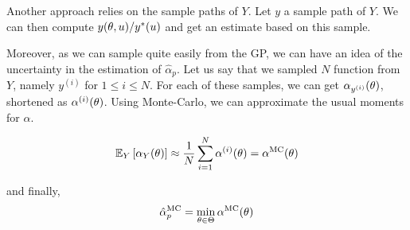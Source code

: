 \documentclass[../../Main_ManuscritThese.tex]{subfiles}
\begin{document}
Another approach relies on the sample paths of $Y$. Let $y$ a sample path of $Y$. We can then compute $y(\theta, u)/y^*(u)$ and get an estimate based on this sample.

Moreover, as we can sample quite easily from the GP, we can have an idea of the uncertainty in the estimation of $\hat{\alpha}_p$.
Let us say that we sampled $N$ function from $Y$, namely $y^{(i)}$ for $1 \leq i \leq N$. For each of these samples, we can get $\alpha_{y^{(i)}}(\theta)$, shortened as $\alpha^{(i)}(\theta)$. Using Monte-Carlo, we can approximate the usual moments for $\alpha$.

\begin{equation}
 \mathbb{E}_{Y}\left[\alpha_{Y}(\theta) \right] \approx \frac{1}{N} \sum_{i=1}^N \alpha^{(i)}(\theta) = \alpha^{\mathrm{MC}}(\theta)
\end{equation}

and finally,
\begin{equation}
  \hat{\alpha}_p^{\mathrm{MC}} = \min_{\theta \in \Theta} \alpha^{\mathrm{MC}}(\theta)
\end{equation}



%   
\end{document}
